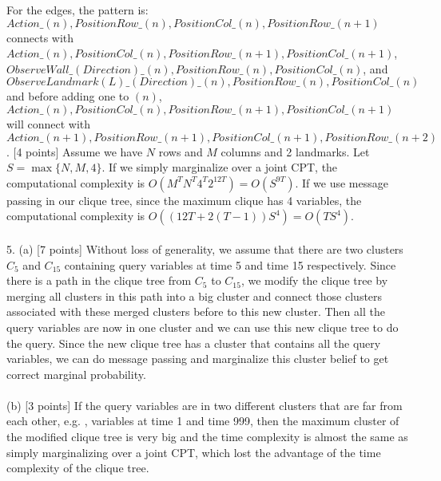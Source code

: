 \documentclass[a4paper]{article}
\begin{document}
\noindent
For the edges, the pattern is:\\
$Action\_(n),PositionRow\_(n),PositionCol\_(n),PositionRow\_(n+1)$\\
connects with\\
$Action\_(n),PositionCol\_(n),PositionRow\_(n+1),PositionCol\_(n+1)$, \\
$ObserveWall\_(Direction)\_(n),PositionRow\_(n),PositionCol\_(n)$, and\\
$ObserveLandmark(L)\_(Direction)\_(n),PositionRow\_(n),PositionCol\_(n)$\\

\noindent
and before adding one to $(n)$, \\
$Action\_(n),PositionCol\_(n),PositionRow\_(n+1),PositionCol\_(n+1)$\\ 
will connect with\\ 
$Action\_(n+1),PositionRow\_(n+1),PositionCol\_(n+1),PositionRow\_(n+2)$\\

. [4 points]
Assume we have $N$ rows and $M$ columns and 2 landmarks. Let $S = \max\{N, M, 4\}$.
If we simply marginalize over a joint CPT, the computational complexity is $O(M^TN^T4^T2^{12T}) = O(S^{9T})$. If we use message passing in our clique tree, since the maximum clique has 4 variables, the computational complexity is $O((12T + 2(T-1))S^4) = O(TS^4)$.\\
\\
5. (a) [7 points]
Without loss of generality, we assume that there are two clusters $C_5$ and $C_{15}$ containing query variables at time 5 and time 15 respectively. Since there is a path in the clique tree from $C_5$ to $C_{15}$, we modify the clique tree by merging all clusters in this path into a big cluster and connect those clusters associated with these merged clusters before to this new cluster. Then all the query variables are now in one cluster and we can use this new clique tree to do the query. Since the new clique tree has a cluster that contains all the query variables, we can do message passing and marginalize this cluster belief to get correct marginal probability.\\
\\
(b) [3 points]
If the query variables are in two different clusters that are far from each other, e.g. , variables at time 1 and time 999, then the maximum cluster of the modified clique tree is very big and the time complexity is almost the same as simply marginalizing over a joint CPT, which lost the advantage of the time complexity of the clique tree.
\end{document}
